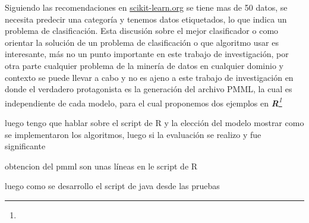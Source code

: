  Siguiendo las recomendaciones en \href{http://scikit-learn.org/stable/tutorial/machine_learning_map/index.html}{scikit-learn.org} se tiene mas de 50 datos, se necesita predecir una categoría y tenemos datos etiquetados, lo que indica un problema de clasificación. Esta discusión sobre el mejor clasificador o como orientar la solución de un problema de clasificación o que algoritmo usar\cite{Caruana2006, Izenman2006, Hastie2009} es interesante, más no un punto importante en este trabajo de investigación, por otra parte cualquier problema de la minería de datos en cualquier dominio y contexto se puede llevar a cabo y no es ajeno a este trabajo de investigación en donde el verdadero protagonista es la generación del archivo PMML, la cual es independiente de cada modelo, para el cual proponemos dos ejemplos en \textit{\textbf{R}\footnote{  }} 
 
 
 
 luego tengo que hablar sobre el script de R y la elección del modelo mostrar como se implementaron los algoritmos, luego si la evaluación se realizo y fue significante
 
 obtencion del pmml son unas líneas en le script de R 
 
 luego como se desarrollo el script de java desde las pruebas
 
  
 
 
